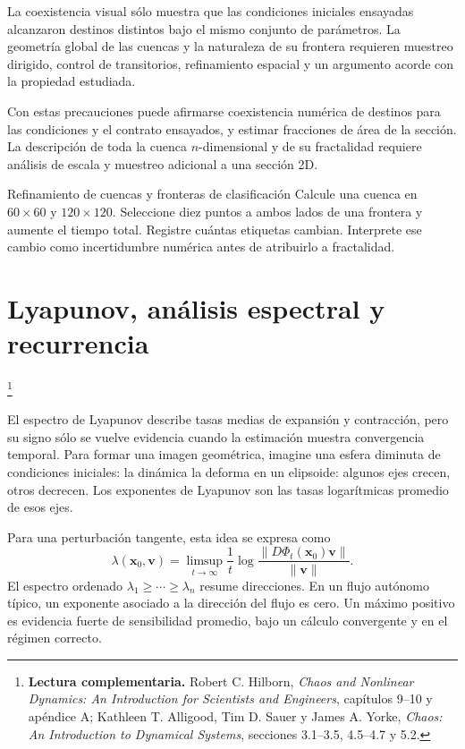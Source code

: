 \documentclass[11pt,a4paper]{article}
\newcommand{\lecturaseccion}[1]{%
  \par\noindent{\sffamily\scriptsize\color{Teal}Lectura complementaria}\footnote{%
  \textbf{Lectura complementaria.} #1}\par}
\begin{document}
\begin{warningbox}
La coexistencia visual sólo muestra que las condiciones iniciales ensayadas alcanzaron
destinos distintos bajo el mismo conjunto de parámetros. La geometría global de las
cuencas y la naturaleza de su frontera requieren muestreo dirigido, control de
transitorios, refinamiento espacial y un argumento acorde con la propiedad estudiada.
\end{warningbox}

Con estas precauciones puede afirmarse coexistencia numérica de destinos para las
condiciones y el contrato
ensayados, y estimar fracciones de área de la sección. La descripción de toda la cuenca $n$-dimensional y de su fractalidad requiere análisis de escala y muestreo adicional a una sección 2D.

\begin{activitybox}{Refinamiento de cuencas y fronteras de clasificación}
Calcule una cuenca en $60\times60$ y $120\times120$. Seleccione diez puntos a ambos
lados de una frontera y aumente el tiempo total. Registre cuántas etiquetas cambian.
Interprete ese cambio como incertidumbre numérica antes de atribuirlo a fractalidad.
\end{activitybox}

\section{Lyapunov, análisis espectral y recurrencia}
\lecturaseccion{Robert C. Hilborn, \emph{Chaos and Nonlinear Dynamics: An Introduction for Scientists and Engineers}, capítulos 9--10 y apéndice A; Kathleen T. Alligood, Tim D. Sauer y James A. Yorke, \emph{Chaos: An Introduction to Dynamical Systems}, secciones 3.1--3.5, 4.5--4.7 y 5.2.}

El espectro de Lyapunov describe tasas medias de expansión y contracción, pero su signo
sólo se vuelve evidencia cuando la estimación muestra convergencia temporal. Para
formar una imagen geométrica, imagine una esfera diminuta de condiciones iniciales:
la dinámica la deforma en un
elipsoide: algunos ejes crecen, otros decrecen. Los exponentes de Lyapunov son las
tasas logarítmicas promedio de esos ejes.

Para una perturbación tangente, esta idea se expresa como
\[
 \lambda(\mathbf{x}_0,\mathbf v)=
 \limsup_{t\to\infty}\frac{1}{t}
 \log\frac{\|D\Phi_t(\mathbf{x}_0)\mathbf v\|}{\|\mathbf v\|}.
\]
El espectro ordenado $\lambda_1\ge\cdots\ge\lambda_n$ resume direcciones. En un
flujo autónomo típico, un exponente asociado a la dirección del flujo es cero. Un
máximo positivo es evidencia fuerte de sensibilidad promedio, bajo un cálculo
convergente y en el régimen correcto.
\end{document}
